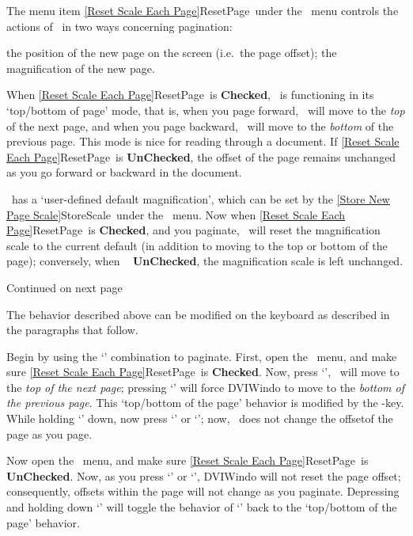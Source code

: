 The menu item \ref{Reset Scale Each Page}{ResetPage}\ under the
\ menu controls the actions of \ in two
ways concerning pagination:

\BeginBulletList
   \Item the position of the new page on the screen (i.e.\ the page offset);
   \Item the magnification of the new page.
\EndBulletList

When \ref{Reset Scale Each Page}{ResetPage}\ is {\bf Checked},
\ is functioning in its `top/bottom of page' mode, that is,
when you page forward, \ will move to the {\it top\/} of
the next page, and when you page backward, \ will move to
the {\it bottom\/} of the previous page.  This mode is nice for reading
through a document.  If \ref{Reset Scale Each Page}{ResetPage}\ is {\bf
UnChecked}, the offset of the page remains unchanged as you go forward
or backward in the document.

 

\ has a `user-defined default magnification', which can be
set by the \ref{Store New Page Scale}{StoreScale}\ under the 
\ menu.   Now when \ref{Reset Scale Each Page}{ResetPage}\ is {\bf
Checked}, and you paginate, \ will reset the magnification
scale to the current default (in addition to moving to the top or bottom
of the page); conversely, when \ {\bf
UnChecked}, the magnification scale is left unchanged.

	\medskip

Continued on next page\ellipses

\newpage

The behavior described above can be modified on the keyboard as
described in the paragraphs that follow. 

Begin by using the `' combination to paginate. 
First, open the \ menu, and make sure \ref{Reset Scale
Each Page}{ResetPage}\ is {\bf Checked}.  Now, press `',
\ will move to the {\it top of the next page}; pressing
`' will force DVIWindo to move to the {\it bottom of the
previous page}.  This `top/bottom of the page' behavior is modified by
the -key.  While holding `' down, now press 
`' or `'; 
now, \ does not change the offsetof the page as you page.

Now open the \ menu, and make sure \ref{Reset Scale Each
Page}{ResetPage}\ is {\bf UnChecked}.  Now, as you press `'
or `', DVIWindo will not reset the page offset; consequently,
offsets within the page will not change as you paginate.  Depressing and
holding down `' will toggle the behavior of `' back to the `top/bottom of the page' behavior.

